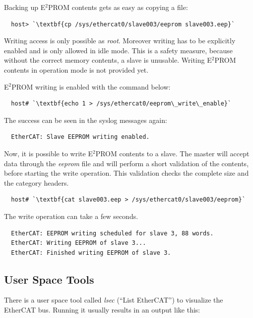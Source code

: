 \documentclass[a4paper,12pt,BCOR6mm,bibtotoc,idxtotoc]{scrbook}
\begin{document}
Backing up E$^2$PROM contents gets as easy as copying a file:

\begin{lstlisting}
  host> `\textbf{cp /sys/ethercat0/slave003/eeprom slave003.eep}`
\end{lstlisting}

Writing access is only possible as \textit{root}. Moreover writing has
to be explicitly enabled and is only allowed in idle mode. This is a
safety measure, because without the correct memory contents, a slave
is unusable. Writing E$^2$PROM contents in operation mode is not
provided yet.

E$^2$PROM writing is enabled with the command below:

\begin{lstlisting}
  host# `\textbf{echo 1 > /sys/ethercat0/eeprom\_write\_enable}`
\end{lstlisting}

The success can be seen in the syslog messages again:

\begin{lstlisting}
  EtherCAT: Slave EEPROM writing enabled.
\end{lstlisting}

Now, it is possible to write E$^2$PROM contents to a slave. The master
will accept data through the \textit{eeprom} file and will perform a
short validation of the contents, before starting the write operation.
This validation checks the complete size and the category headers.

\begin{lstlisting}
  host# `\textbf{cat slave003.eep > /sys/ethercat0/slave003/eeprom}`
\end{lstlisting}

The write operation can take a few seconds.

\begin{lstlisting}
  EtherCAT: EEPROM writing scheduled for slave 3, 88 words.
  EtherCAT: Writing EEPROM of slave 3...
  EtherCAT: Finished writing EEPROM of slave 3.
\end{lstlisting}


\subsection{User Space Tools}

There is a user space tool called \textit{lsec} (``List
EtherCAT'') to visualize the EtherCAT bus. Running it usually results
in an output like this:
\end{document}
